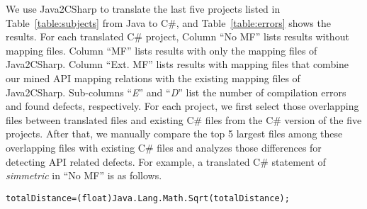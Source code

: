 We use Java2CSharp to translate the last five projects listed in
Table~\ref{table:subjects} from Java to C\#, and
Table~\ref{table:errors} shows the results. For each translated C\#
project, Column ``No MF'' lists results without mapping files.
Column ``MF'' lists results with only the mapping files of Java2CSharp.
Column ``Ext. MF'' lists results with mapping files that combine
our mined API mapping relations with the existing mapping files of Java2CSharp.
Sub-columns ``\emph{E}'' and ``\emph{D}'' list the number of
compilation errors and found defects, respectively. For each project,
we first select those overlapping files between translated files and existing C\# files
from the C\# version of the five projects. After that, we manually compare
the top 5 largest files among these overlapping files with existing C\# files and analyzes those differences for detecting API related defects. For example, a translated C\# statement of \emph{simmetric} in ``No MF'' is as follows.
\begin{CodeOut}\vspace*{-2ex}
\begin{alltt}
 totalDistance = (float)Java.Lang.Math.Sqrt(totalDistance);
\end{alltt}
\end{CodeOut}\vspace*{-2ex}

